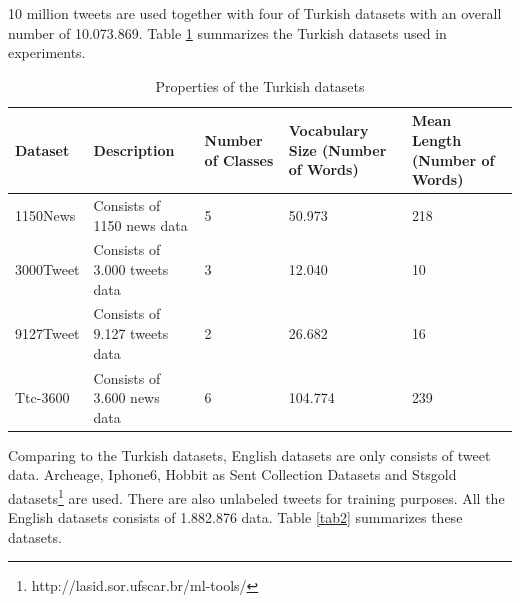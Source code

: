 \documentclass[a4paper,fleqn]{cas-dc}
\begin{document}
10 million tweets are used together with four of Turkish datasets with an overall number of 10.073.869. Table \ref{tab1} summarizes the Turkish datasets used in experiments. 


\begin{table}
	\caption{Properties of the Turkish datasets}	\label{tab1}
	\begin{tabular*}{\tblwidth}{ p{36pt}p{67pt}p{40pt}p{77pt}p{77pt} }
		\toprule
		\textbf{Dataset} & \textbf{Description} & \textbf{Number of Classes} & \textbf{\phantom{a} Vocabulary Size \phantom{a}  (Number of Words)} & \textbf{\phantom{aa}  Mean Length \phantom{aa} (Number of Words) } \\ 
		\midrule
		1150News         &  Consists of 1150 news data                             & 5             & 50.973                                                                                & 218                                                                                          \\ 
		3000Tweet          &Consists of 3.000 tweets data                              & 3               & 12.040                                                                                & 10                                                                                          \\ 
		9127Tweet           &Consists of 9.127 tweets data                              & 2               & 26.682                                                                                & 16                                                                                          \\ 
		Ttc-3600            &Consists of 3.600 news data                              & 6             & 104.774                                                                                & 239                                                                                          \\ 
		\bottomrule
	\end{tabular*}
\end{table}


Comparing to the Turkish datasets, English datasets are only consists of tweet data. Archeage, Iphone6, Hobbit as Sent Collection Datasets and Stsgold \cite{ref19} datasets\footnote{http://lasid.sor.ufscar.br/ml-tools/} are used. There are also unlabeled tweets for training purposes. All the English datasets consists of 1.882.876 data. Table \ref{tab2} summarizes these datasets. 
\end{document}
